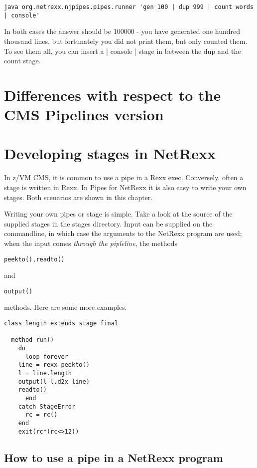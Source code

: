 \begin{lstlisting}[label=testdup,caption=Test Dup]
java org.netrexx.njpipes.pipes.runner 'gen 100 | dup 999 | count words | console'
\end{lstlisting}

In both cases the answer should be 100000 - you have generated one
hundred thousand lines, but fortunately you did not print them, but
only counted them. To see them all, you can insert a | console | stage
in between the dup and the count stage.

\chapter{Differences with respect to the CMS Pipelines version}

\chapter{Developing stages in NetRexx}

In z/VM CMS, it is common to use a pipe in a Rexx exec. Conversely,
often a stage is written in Rexx. In Pipes for
NetRexx it is also easy to write your own stages. Both scenarios are
shown in this chapter.

Writing your own pipes or stage is simple.  Take a look at the source
of the supplied stages in the stages directory.  Input can be supplied
on the commandline, in which case the arguments to the NetRexx program
are used; when the input comes \emph{through the pipleline}, the
methods \begin{alltt}peekto(), readto()\end{alltt}
and \begin{alltt}output()\end{alltt} methods. Here are some more
examples.
\begin{lstlisting}
class length extends stage final
 
  method run()
    do
      loop forever
    line = rexx peekto()
    l = line.length
    output(l l.d2x line)
    readto()
      end
    catch StageError
      rc = rc()
    end
    exit(rc*(rc<>12))
  \end{lstlisting}
  
\section{How to use a pipe in a NetRexx program}

